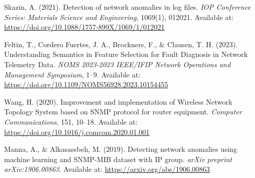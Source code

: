 \documentclass[11pt]{article}
\begin{document}
\begin{thebibliography}{9}
Skazin, A. (2021).
Detection of network anomalies in log files.
\textit{IOP Conference Series: Materials Science and Engineering}, 1069(1), 012021.
Available at: \href{https://doi.org/10.1088/1757-899X/1069/1/012021}{https://doi.org/10.1088/1757-899X/1069/1/012021}

Feltin, T., Cordero Fuertes, J. A., Brockners, F., \& Clausen, T. H. (2023).
Understanding Semantics in Feature Selection for Fault Diagnosis in Network Telemetry Data.
\textit{NOMS 2023-2023 IEEE/IFIP Network Operations and Management Symposium}, 1--9.
Available at: \href{https://doi.org/10.1109/NOMS56928.2023.10154455}{https://doi.org/10.1109/NOMS56928.2023.10154455}

Wang, H. (2020).
Improvement and implementation of Wireless Network Topology System based on SNMP protocol for router equipment.
\textit{Computer Communications}, 151, 10--18.
Available at: \href{https://doi.org/10.1016/j.comcom.2020.01.001}{https://doi.org/10.1016/j.comcom.2020.01.001}

Manna, A., \& Alkasassbeh, M. (2019).
Detecting network anomalies using machine learning and SNMP-MIB dataset with IP group.
\textit{arXiv preprint arXiv:1906.00863}.
Available at: \href{https://arxiv.org/abs/1906.00863}{https://arxiv.org/abs/1906.00863}

\end{thebibliography}
\end{document}
